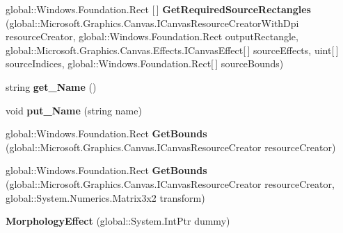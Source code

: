 \begin{DoxyCompactItemize}
global\+::\+Windows.\+Foundation.\+Rect \mbox{[}$\,$\mbox{]} {\bfseries Get\+Required\+Source\+Rectangles} (global\+::\+Microsoft.\+Graphics.\+Canvas.\+I\+Canvas\+Resource\+Creator\+With\+Dpi resource\+Creator, global\+::\+Windows.\+Foundation.\+Rect output\+Rectangle, global\+::\+Microsoft.\+Graphics.\+Canvas.\+Effects.\+I\+Canvas\+Effect\mbox{[}$\,$\mbox{]} source\+Effects, uint\mbox{[}$\,$\mbox{]} source\+Indices, global\+::\+Windows.\+Foundation.\+Rect\mbox{[}$\,$\mbox{]} source\+Bounds)
\item 
\mbox{\label{class_microsoft_1_1_graphics_1_1_canvas_1_1_effects_1_1_morphology_effect_a255bc7bed18329d2c61fac107439dea6}} 
string {\bfseries get\+\_\+\+Name} ()
\item 
\mbox{\label{class_microsoft_1_1_graphics_1_1_canvas_1_1_effects_1_1_morphology_effect_a013f5c2e209a17200348842a621476bf}} 
void {\bfseries put\+\_\+\+Name} (string name)
\item 
\mbox{\label{class_microsoft_1_1_graphics_1_1_canvas_1_1_effects_1_1_morphology_effect_a4cc93d1ce89bb136bf248b44ce57e0cc}} 
global\+::\+Windows.\+Foundation.\+Rect {\bfseries Get\+Bounds} (global\+::\+Microsoft.\+Graphics.\+Canvas.\+I\+Canvas\+Resource\+Creator resource\+Creator)
\item 
\mbox{\label{class_microsoft_1_1_graphics_1_1_canvas_1_1_effects_1_1_morphology_effect_af73df5ff1be6441e88acfd8ace44c35a}} 
global\+::\+Windows.\+Foundation.\+Rect {\bfseries Get\+Bounds} (global\+::\+Microsoft.\+Graphics.\+Canvas.\+I\+Canvas\+Resource\+Creator resource\+Creator, global\+::\+System.\+Numerics.\+Matrix3x2 transform)
\item 
\mbox{\label{class_microsoft_1_1_graphics_1_1_canvas_1_1_effects_1_1_morphology_effect_a2d9ece50b1dd157dfb4ba3fd5a775b2b}} 
{\bfseries Morphology\+Effect} (global\+::\+System.\+Int\+Ptr dummy)
\item 
\mbox{\label{class_microsoft_1_1_graphics_1_1_canvas_1_1_effects_1_1_morphology_effect_a53c33ad9e69a2a3019abd0f92a5654ba}} 

\end{DoxyCompactItemize}
